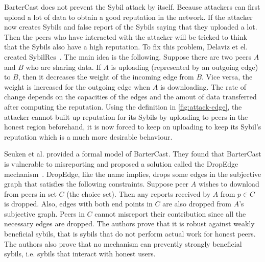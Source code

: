 BarterCast does not prevent the Sybil attack by itself. Because attackers can
first upload a lot of data to obtain a good reputation in the network. If the
attacker now creates Sybils and false report of the Sybils saying that they
uploaded a lot. Then the peers who have interacted with the attacker will be
tricked to think that the Sybils also have a high reputation. To fix this
problem, Delaviz et el. created SybilRes~\cite{delaviz2012sybilres}.
The main idea is the following. Suppose there are two peers $A$ and $B$ who are
sharing data. If $A$ is uploading (represented by an outgoing edge) to $B$, then
it decreases the weight of the incoming edge from $B$. Vice versa, the weight is
increased for the outgoing edge when $A$ is downloading. The rate of change
depends on the capacities of the edges and the amout of data transferred after
computing the reputation. Using the definition in \autoref{fig:attack-edge}, the
attacker cannot built up reputation for its Sybils by uploading to peers in the
honest region beforehand, it is now forced to keep on uploading to keep its
Sybil's reputation which is a much more desirable behaviour.

Seuken et al. provided a formal model of BarterCast. They found that BarterCast
is vulnerable to misreporting and proposed a solution called the DropEdge
mechanism~\cite{seuken2011sybil, seuken2014sybil}. DropEdge, like the name
implies, drops some edges in the subjective graph that satisfies the following
constraints. Suppose peer $A$ wishes to download from peers in set $C$ (the
choice set). Then any reports received by $A$ from $p \in C$ is dropped. Also,
edges with both end points in $C$ are also dropped from $A$'s subjective graph.
Peers in $C$ cannot misreport their contribution since all the necessary edges
are dropped. The authors prove that it is robust against weakly beneficial
sybils, that is sybils that do not perform actual work for honest peers. The
authors also prove that no mechanism can prevently strongly beneficial sybils,
i.e. sybils that interact with honest users.

